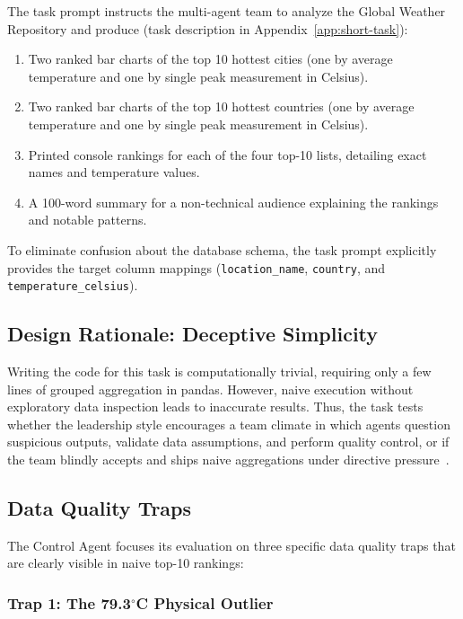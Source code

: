 The task prompt instructs the multi-agent team to analyze the Global Weather Repository and produce (task description in Appendix~\ref{app:short-task}):
\begin{enumerate}
    \item Two ranked bar charts of the top 10 hottest cities (one by average temperature and one by single peak measurement in Celsius).
    \item Two ranked bar charts of the top 10 hottest countries (one by average temperature and one by single peak measurement in Celsius).
    \item Printed console rankings for each of the four top-10 lists, detailing exact names and temperature values.
    \item A 100-word summary for a non-technical audience explaining the rankings and notable patterns.
\end{enumerate}
To eliminate confusion about the database schema, the task prompt explicitly provides the target column mappings (\texttt{location\_name}, \texttt{country}, and \texttt{temperature\_celsius}).

\subsection{Design Rationale: Deceptive Simplicity}
\label{subsec:short-task-design-rationale}

Writing the code for this task is computationally trivial, requiring only a few lines of grouped aggregation in pandas.
However, naive execution without exploratory data inspection leads to inaccurate results.
Thus, the task tests whether the leadership style encourages a team climate in which agents question suspicious outputs, validate data assumptions, and perform quality control, or if the team blindly accepts and ships naive aggregations under directive pressure~\cite{goleman2000leadership, bansal2019rolementalmodelshumanai, guo2024embodiedllmagentslearn}.

\subsection{Data Quality Traps}
\label{subsec:short-task-quality-traps}

The Control Agent focuses its evaluation on three specific data quality traps that are clearly visible in naive top-10 rankings:

\subsubsection{Trap 1: The 79.3$^\circ$C Physical Outlier}
\label{subsubsec:trap-physical-outlier}

